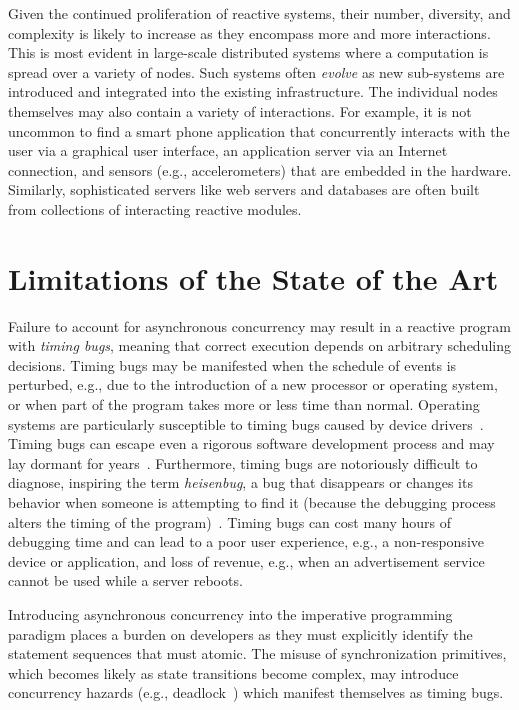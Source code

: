 Given the continued proliferation of reactive systems, their number, diversity, and complexity is likely to increase as they encompass more and more interactions.
This is most evident in large-scale distributed systems where a computation is spread over a variety of nodes.
Such systems often \emph{evolve} as new sub-systems are introduced and integrated into the existing infrastructure.
The individual nodes themselves may also contain a variety of interactions.
For example, it is not uncommon to find a smart phone application that concurrently interacts with the user via a graphical user interface, an application server via an Internet connection, and sensors (e.g., accelerometers) that are embedded in the hardware.
Similarly, sophisticated servers like web servers and databases are often built from collections of interacting reactive modules.

\section{Limitations of the State of the Art}
\label{limitations}

Failure to account for asynchronous concurrency may result in a reactive program with \emph{timing bugs}, meaning that correct execution depends on arbitrary scheduling decisions.
Timing bugs may be manifested when the schedule of events is perturbed, e.g., due to the introduction of a new processor or operating system, or when part of the program takes more or less time than normal.
Operating systems are particularly susceptible to timing bugs caused by device drivers~\cite{ryzhyk2009dingo}.
Timing bugs can escape even a rigorous software development process and may lay dormant for years~\cite{lee2006problem}.
Furthermore, timing bugs are notoriously difficult to diagnose, inspiring the term \emph{heisenbug}, a bug that disappears or changes its behavior when someone is attempting to find it (because the debugging process alters the timing of the program)~\cite{1983proceedings}.
Timing bugs can cost many hours of debugging time and can lead to a poor user experience, e.g., a non-responsive device or application, and loss of revenue, e.g., when an advertisement service cannot be used while a server reboots.

Introducing asynchronous concurrency into the imperative programming paradigm places a burden on developers as they must explicitly identify the statement sequences that must atomic.
The misuse of synchronization primitives, which becomes likely as state transitions become complex, may introduce concurrency hazards (e.g., deadlock~\cite{dijkstra1965cooperating}) which manifest themselves as timing bugs.

